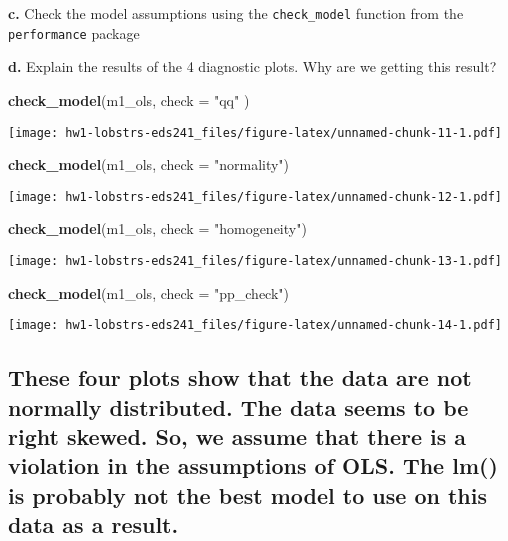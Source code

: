 \documentclass[
]{article}
\newenvironment{Shaded}{\begin{snugshade}}{\end{snugshade}}
\newcommand{\AttributeTok}[1]{\textcolor[rgb]{0.13,0.29,0.53}{#1}}
\newcommand{\FunctionTok}[1]{\textcolor[rgb]{0.13,0.29,0.53}{\textbf{#1}}}
\newcommand{\NormalTok}[1]{#1}
\newcommand{\StringTok}[1]{\textcolor[rgb]{0.31,0.60,0.02}{#1}}
\begin{document}
\textbf{c.} Check the model assumptions using the \texttt{check\_model}
function from the \texttt{performance} package

\textbf{d.} Explain the results of the 4 diagnostic plots. Why are we
getting this result?

\begin{Shaded}
\begin{Highlighting}[]
\FunctionTok{check\_model}\NormalTok{(m1\_ols,  }\AttributeTok{check =} \StringTok{"qq"}\NormalTok{ )}
\end{Highlighting}
\end{Shaded}

\texttt{[image: hw1-lobstrs-eds241\_files/figure-latex/unnamed-chunk-11-1.pdf]}

\begin{Shaded}
\begin{Highlighting}[]
\FunctionTok{check\_model}\NormalTok{(m1\_ols, }\AttributeTok{check =} \StringTok{"normality"}\NormalTok{)}
\end{Highlighting}
\end{Shaded}

\texttt{[image: hw1-lobstrs-eds241\_files/figure-latex/unnamed-chunk-12-1.pdf]}

\begin{Shaded}
\begin{Highlighting}[]
\FunctionTok{check\_model}\NormalTok{(m1\_ols, }\AttributeTok{check =} \StringTok{"homogeneity"}\NormalTok{)}
\end{Highlighting}
\end{Shaded}

\texttt{[image: hw1-lobstrs-eds241\_files/figure-latex/unnamed-chunk-13-1.pdf]}

\begin{Shaded}
\begin{Highlighting}[]
\FunctionTok{check\_model}\NormalTok{(m1\_ols, }\AttributeTok{check =} \StringTok{"pp\_check"}\NormalTok{)}
\end{Highlighting}
\end{Shaded}

\texttt{[image: hw1-lobstrs-eds241\_files/figure-latex/unnamed-chunk-14-1.pdf]}

\subsection{\texorpdfstring{\textbf{These four plots show that the data
are not normally distributed. The data seems to be right skewed. So, we
assume that there is a violation in the assumptions of OLS. The lm() is
probably not the best model to use on this data as a
result.}}{These four plots show that the data are not normally distributed. The data seems to be right skewed. So, we assume that there is a violation in the assumptions of OLS. The lm() is probably not the best model to use on this data as a result.}}\label{these-four-plots-show-that-the-data-are-not-normally-distributed.-the-data-seems-to-be-right-skewed.-so-we-assume-that-there-is-a-violation-in-the-assumptions-of-ols.-the-lm-is-probably-not-the-best-model-to-use-on-this-data-as-a-result.}
\end{document}
